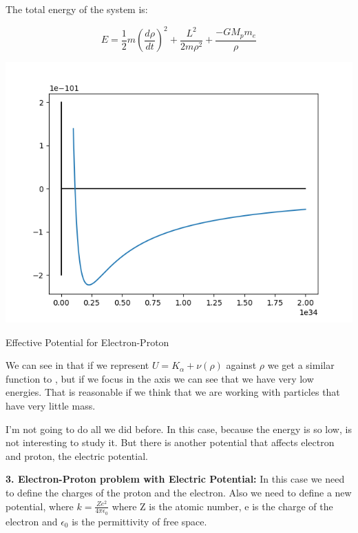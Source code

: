 The total energy of the system is:

\begin{equation}
\label{energy_E-P_mass}
    E = \frac{1}{2}m\left(\frac{d\rho}{dt}\right)^2+\frac{L^2}{2m\rho^2}+ \frac{ - G M_p m_e}{\rho}
\end{equation}

\begin{marginfigure}
    \includegraphics{images/E-P_Potential_Well.png}
    \caption[Effective Potential for Electron-Proton]{Effective Potential for Electron-Proton}
\end{marginfigure}

We can see in  that if we represent $U = K_{\alpha}+\nu(\rho)$ against $\rho$ we get a similar function to , but if we focus in the axis we can see that we have very low energies. That is reasonable if we think that we are working with particles that have very little mass.

I'm not going to do all we did before. In this case, because the energy is so low, is not interesting to study it. But there is another potential that affects electron and proton, the electric potential.

\textbf{3. Electron-Proton problem with Electric Potential:} In this case we need to define the charges of the proton and the electron. Also we need to define a new potential, where $ k = \frac{Ze^2}{4\pi\epsilon_0} $ where Z is the atomic number, e is the charge of the electron   and $\epsilon_0$ is the permittivity of free space.

